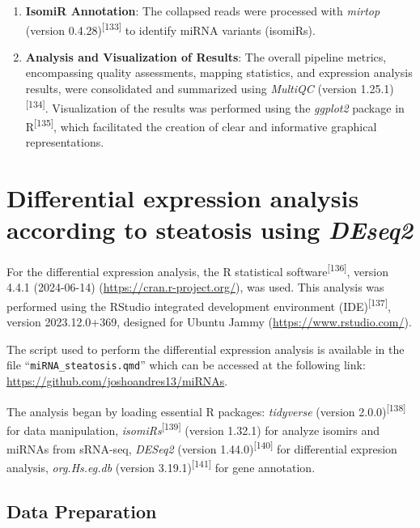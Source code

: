 \documentclass[
  11pt,
  letterpaper,
]{book}
\begin{document}
\begin{enumerate}
\def\labelenumi{\arabic{enumi}.}
\setcounter{enumi}{3}
\item
  \textbf{IsomiR Annotation}: The collapsed reads were processed with
  \emph{mirtop} (version 0.4.28)\textsuperscript{{[}133{]}} to identify
  miRNA variants (isomiRs).
\item
  \textbf{Analysis and Visualization of Results}: The overall pipeline
  metrics, encompassing quality assessments, mapping statistics, and
  expression analysis results, were consolidated and summarized using
  \emph{MultiQC} (version 1.25.1)\textsuperscript{{[}134{]}}.
  Visualization of the results was performed using the \emph{ggplot2}
  package in R\textsuperscript{{[}135{]}}, which facilitated the
  creation of clear and informative graphical representations.
\end{enumerate}

\section{\texorpdfstring{Differential expression analysis according to
steatosis using
\emph{DEseq2}}{Differential expression analysis according to steatosis using DEseq2}}\label{differential-expression-analysis-according-to-steatosis-using-deseq2}

For the differential expression analysis, the R statistical
software\textsuperscript{{[}136{]}}, version 4.4.1 (2024-06-14)
(\url{https://cran.r-project.org/}), was used. This analysis was
performed using the RStudio integrated development environment
(IDE)\textsuperscript{{[}137{]}}, version 2023.12.0+369, designed for
Ubuntu Jammy (\url{https://www.rstudio.com/}).

The script used to perform the differential expression analysis is
available in the file ``\texttt{miRNA\_steatosis.qmd}'' which can be
accessed at the following link:
\url{https://github.com/joshoandres13/miRNAs}.

The analysis began by loading essential R packages: \emph{tidyverse}
(version 2.0.0)\textsuperscript{{[}138{]}} for data manipulation,
\emph{isomiRs}\textsuperscript{{[}139{]}} (version 1.32.1) for analyze
isomirs and miRNAs from sRNA-seq, \emph{DESeq2} (version
1.44.0)\textsuperscript{{[}140{]}} for differential expresion analysis,
\emph{org.Hs.eg.db} (version 3.19.1)\textsuperscript{{[}141{]}} for gene
annotation.

\subsection{Data Preparation}\label{data-preparation}
\end{document}

